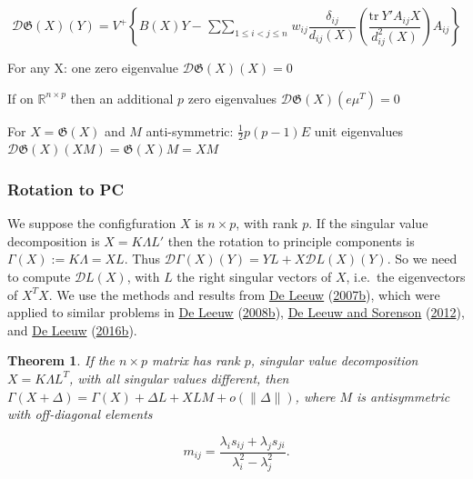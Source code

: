 \documentclass[
  12pt,
]{book}
\newtheorem{theorem}{Theorem}[chapter]
\theoremstyle{definition}
\theoremstyle{definition}
\theoremstyle{definition}
\theoremstyle{definition}
\theoremstyle{remark}
\begin{document}
\[
\mathcal{D}\mathfrak{G}(X)(Y)=V^+\left\{B(X)Y-\mathop{\sum\sum}_{1\leq i<j\leq n} w_{ij}\frac{\delta_{ij}}{d_{ij}(X)}\left(\frac{\text{tr}\ Y'A_{ij}X}{d_{ij}^2(X)}\right)A_{ij}\right\}
\]

For any X: one zero eigenvalue \(\mathcal{D}\mathfrak{G}(X)(X)=0\)

If on \(\mathbb{R}^{n\times p}\) then an additional \(p\) zero eigenvalues \(\mathcal{D}\mathfrak{G}(X)(e\mu^T)=0\)

For \(X=\mathfrak{G}(X)\) and \(M\) anti-symmetric: \(\frac12 p(p-1)E\) unit eigenvalues \(\mathcal{D}\mathfrak{G}(X)(XM)=\mathfrak{G}(X)M=XM\)

\hypertarget{rotation-to-pc}{%
\subsubsection{Rotation to PC}\label{rotation-to-pc}}

We suppose the configfuration \(X\) is \(n\times p\), with rank \(p\).
If the singular value decomposition is \(X=K\Lambda L'\) then the rotation to principle components is \(\Gamma(X):=K\Lambda=XL\). Thus \(\mathcal{D}\Gamma(X)(Y)=YL+X\mathcal{D}L(X)(Y)\). So we need to compute \(\mathcal{D}L(X)\), with \(L\) the right singular vectors of
\(X\), i.e.~the eigenvectors of \(X^TX\). We use the methods and results from \protect\hyperlink{ref-deleeuw_R_07c}{De Leeuw} (\protect\hyperlink{ref-deleeuw_R_07c}{2007b}), which were applied to similar problems in \protect\hyperlink{ref-deleeuw_R_08b}{De Leeuw} (\protect\hyperlink{ref-deleeuw_R_08b}{2008b}), \protect\hyperlink{ref-deleeuw_sorenson_U_12b}{De Leeuw and Sorenson} (\protect\hyperlink{ref-deleeuw_sorenson_U_12b}{2012}), and \protect\hyperlink{ref-deleeuw_E_16p}{De Leeuw} (\protect\hyperlink{ref-deleeuw_E_16p}{2016b}).

\begin{theorem}
\protect\hypertarget{thm:minrotpc}{}{\label{thm:minrotpc} }If the \(n\times p\) matrix has rank \(p\), singular value decomposition \(X=K\Lambda L^T\), with all singular values different, then
\(\Gamma(X+\Delta)=\Gamma(X)+\Delta L+XLM+o(\|\Delta\|)\), where \(M\) is antisymmetric
with off-diagonal elements

\begin{equation}
m_{ij}=\frac{\lambda_is_{ij}+\lambda_js_{ji}}{\lambda_i^2-\lambda_j^2}.
\label{eq:minsvdmsolve}
\end{equation}
\end{theorem}
\end{document}
